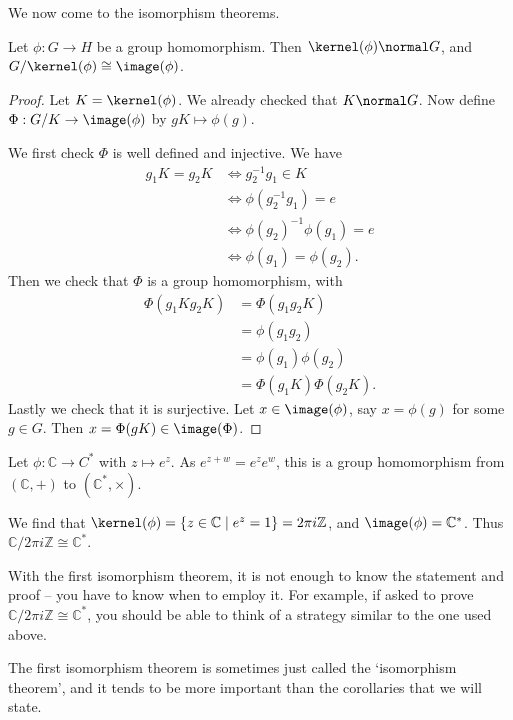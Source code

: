 \documentclass[a4paper]{scrartcl}
\begin{document}
We now come to the isomorphism theorems.

\begin{theorem}
	Let $\phi: G \rightarrow H$ be a group homomorphism. Then $\kernel(\phi) \normal G$, and $G/\kernel(\phi) \cong \image(\phi)$.
\end{theorem}
\begin{proof}
	Let $K = \kernel(\phi)$. We already checked that $K \normal G$. Now define $\Phi: G/K \rightarrow \image(\phi)$ by $gK \mapsto \phi(g)$.

	We first check $\Phi$ is well defined and injective. We have
	\begin{align*}
		g_1K = g_2K &\iff g_2^{-1} g_1 \in K \\
		&\iff \phi(g_2^{-1}g_1) = e \\
		&\iff \phi(g_2)^{-1} \phi(g_1) = e  \\
		&\iff \phi(g_1) = \phi(g_2).
	\end{align*}
	Then we check that $\Phi$ is a group homomorphism, with
	\begin{align*}
		\Phi(g_1 K g_2 K) &= \Phi(g_1 g_2 K) \\
			&= \phi(g_1 g_2) \\
			&= \phi(g_1) \phi(g_2) \\
			&= \Phi(g_1 K) \Phi(g_2 K).
	\end{align*}
	Lastly we check that it is surjective. Let $x \in \image(\phi)$, say $x = \phi(g)$ for some $g \in G$. Then $x = \Phi(gK) \in \image(\Phi)$.
\end{proof}

\begin{example}
	Let $\phi : \mathbb{C} \rightarrow C^{*}$ with $z \mapsto e^z$. As $e^{z + w} = e^z e^w$, this is a group homomorphism from $(\mathbb{C}, +)$ to $(\mathbb{C}^*, \times)$. 

	We find that $\kernel(\phi) = \{ z \in \mathbb{C} \mid e^z = 1 \} = 2 \pi i \mathbb{Z}$, and $\image(\phi) = \mathbb{C}^*$. Thus $\mathbb{C}/2 \pi i \mathbb{Z} \cong \mathbb{C}^*$.
\end{example}

With the first isomorphism theorem, it is not enough to know the statement and proof -- you have to know when to employ it. For example, if asked to prove $\mathbb{C}/2 \pi i \mathbb{Z} \cong \mathbb{C}^*$, you should be able to think of a strategy similar to the one used above.

The first isomorphism theorem is sometimes just called the `isomorphism theorem', and it tends to be more important than the corollaries that we will state.
\end{document}
